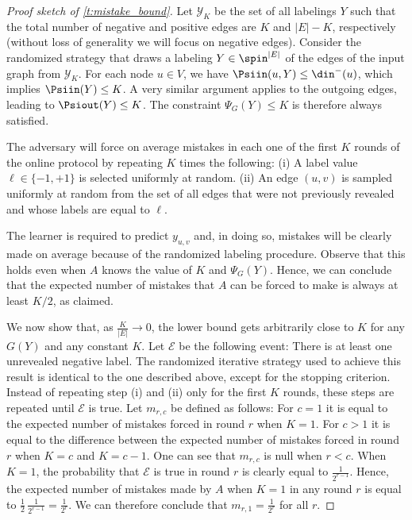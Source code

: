 \begin{proof}[Proof sketch of \autoref{t:mistake_bound}]

Let $\mathcal{Y}_K$ be the set of all labelings $Y$ such that the total number of negative and
positive edges are $K$ and $|E|-K$, respectively (without loss of generality we will focus on
negative edges). Consider the randomized strategy that draws a labeling $Y \in \spin^{|E|}$ of the
edges of the input graph \uar{} from $\mathcal{Y}_K$. For each node $u \in V$, we have $\Psiin(u,Y)
\le \din^-(u)$, which implies $\Psiin(Y) \le K$. A very similar argument applies to the outgoing
edges, leading to $\Psiout(Y) \le K$. The constraint $\Psi_G(Y) \le K$ is therefore always
satisfied.

The adversary will force on average \shalf{} mistakes in each one of the first $K$ rounds of the
online protocol by repeating $K$ times the following: (i) A label value $\ell\in\{-1,+1\}$ is
selected uniformly at random. (ii) An edge $(u,v)$ is sampled uniformly at random from the set of
all edges that were not previously revealed and whose labels are equal to $\ell$. 

The learner is required to predict $y_{u,v}$ and, in doing so, \shalf{} mistakes will be clearly
made on average because of the randomized labeling procedure. Observe that this holds even when $A$
knows the value of $K$ and $\Psi_G(Y)$. Hence, we can conclude that the expected number of mistakes
that $A$ can be forced to make is always at least $K/2$, as claimed.

\medskip

We now show that, as $\frac{K}{|E|} \rightarrow 0$, the lower bound gets arbitrarily close to $K$
for any $G(Y)$ and any constant $K$.
Let $\mathcal{E}$ be the following event: There is at least one unrevealed negative label.
The randomized iterative strategy used to achieve this result is identical to the one described
above, except for the stopping criterion. Instead of repeating step (i) and (ii) only for the first
$K$ rounds, these steps are repeated until $\mathcal{E}$ is true.
%
Let $m_{r,c}$ be defined as follows: For $c=1$ it is equal to the expected number of mistakes forced
in round $r$ when $K=1$. For $c > 1$ it is equal to the difference between the expected number of
mistakes forced in round $r$ when $K=c$ and $K=c-1$. One can see that $m_{r,c}$ is 
null when $r<c$. 
%
When $K=1$, the probability that $\mathcal{E}$ is true in round $r$ is clearly equal to
$\frac{1}{2^{r-1}}$.
Hence, the expected number of mistakes made by $A$ when $K=1$ in any round $r$ is equal to 
\(
\frac{1}{2}\,\frac{1}{2^{r-1}} = \frac{1}{2^{r}}.
\)
We can therefore conclude that $m_{r,1}=\frac{1}{2^{r}}$ for all $r$.


\end{proof}

